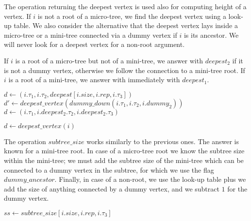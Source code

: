 The operation returning the deepest vertex is used also for computing height of a vertex.
If $i$ is not a root of a micro-tree, we find the deepest vertex using a look-up table.
We also consider the alternative that the deepest vertex lays inside a micro-tree or a mini-tree connected via a dummy vertex if $i$ is its ancestor.
We will never look for a deepest vertex for a non-root argument.

If $i$ is a root of a micro-tree but not of a mini-tree, we answer with $deepest_2$ if it is not a dummy vertex, otherwise we follow the connection to a mini-tree root.
If $i$ is a root of a mini-tree, we answer with immediately with $deepest_1$.

\begin{algorithmic}
		\State $d \gets (i.\tau_1, i.\tau_2, deepest[i.size, i.rep, i.\tau_3])$
			\State $d' \gets deepest\_vertex(dummy\_down(i.\tau_1, i.\tau_2, i.dummy_2))$
				\State {}
			\Else
				\State {}
			\EndIf
		\Else
			\State {}
		\EndIf
		\State $d \gets (i.\tau_1, i.deepest_2.\tau_2, i.deepest_2.\tau_3)$
			\State {}
		\Else
		\EndIf
	\Else
		\State {}
	\EndIf
\EndFunction
\end{algorithmic}

\begin{algorithmic}
	\State $d \gets deepest\_vertex(i)$
	\State {}
\EndFunction
\end{algorithmic}

The operation $subtree\_size$ works similarly to the previous ones.
The answer is known for a mini-tree root.
In case of a micro-tree root we know the subtree size within the mini-tree; we must add the subtree size of the mini-tree which can be connected to a dummy vertex in the subtree, for which we use the flag $dummy\_ancestor$.
Finally, in case of a non-root, we use the look-up table plus we add the size of anything connected by a dummy vertex, and we subtract $1$ for the dummy vertex.

\begin{algorithmic}
		\State $ss \gets subtree\_size[i.size, i.rep, i.\tau_3]$
			\State {}
		\Else
			\State {}
		\EndIf
			\State {}
		\Else
			\State {}
		\EndIf
	\Else
		\State {}
	\EndIf
\EndFunction
\end{algorithmic}

